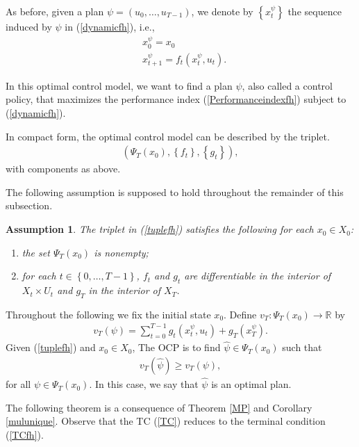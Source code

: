 \documentclass[3p]{elsarticle}
\newtheorem{assu}[thm]{Assumption}
\begin{document}
	
	As before, given a plan $\psi=(u_0,\dots,u_{T-1}) $, we denote by $\left\lbrace x_t^\psi \right\rbrace $ the sequence induced by $\psi$ in (\ref{dynamicfh}), i.e., 
	\begin{align}
	&x_0^\psi=x_0\\
	&x_{t+1}^\psi=f_t(x_t^\psi,u_t).
	\end{align}
	
	
	
	
	In this optimal control model, we want to find a plan $\psi$, also called a control policy, that maximizes the performance index (\ref{Performanceindexfh}) subject to (\ref{dynamicfh}).
	
	In compact form, the optimal control model can be described by the triplet.
	\begin{align}\label{tuplefh}
	(\Psi_T(x_0), \left\lbrace f_t\right\rbrace, \left\lbrace g_t\right\rbrace),
	\end{align} 
	with components as above. 
	
	The following assumption is supposed to hold throughout the remainder of this subsection.
	
	
	\begin{assu}\label{WellPosedfh}
		The triplet in (\ref{tuplefh}) satisfies the following for each $x_0\in X_0$:
		\begin{enumerate}
			\item[(a)] the set $\Psi_T(x_0)$ is nonempty;
			
			
			\item[(b)] for each $t\in\left\lbrace 0,\dots, T-1\right\rbrace $, $f_t$ and $g_t$ are differentiable in the interior of $X_t\times U_t$ and $g_T$ in the interior of $X_T$.
		\end{enumerate}
	\end{assu}
	Throughout the following we fix the initial state $x_0$. Define $v_T:\Psi_T(x_0)\to\mathbb R$ by
	\begin{align}\label{PIfh}
	v_T(\psi)=\sum_{t=0}^{T-1} g_t(x_t^\psi,u_t) + g_T(x_T^\psi).
	\end{align}
	Given (\ref{tuplefh}) and $x_0\in X_0$, The OCP is to find $\hat\psi\in\Psi_T(x_0)$ such that 
	\begin{align*}
	v_T(\hat{\psi})\ge v_T(\psi),
	\end{align*} 
	for all $\psi\in\Psi_T(x_0)$. In this case, we say that $\hat{\psi}$ is an optimal plan.
	
	
	The following theorem is a consequence of Theorem \ref{MP} and Corollary \ref{mulunique}.  Observe that the TC (\ref{TC}) reduces to the terminal condition (\ref{TCfh}).
	
\end{document}
